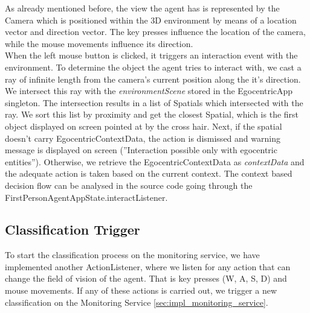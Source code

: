 As already mentioned before, the view the agent has is represented by the Camera which is positioned within the 3D environment by means of a location vector and direction vector. The key presses influence the location of the camera, while the mouse movements influence its direction.\\

When the left mouse button is clicked, it triggers an interaction event with the environment. To determine the object the agent tries to interact with, we cast a ray of infinite length from the camera's current position along the it's direction. We intersect this ray with the \emph{environmentScene} stored in the EgocentricApp singleton. The intersection results in a list of Spatials which intersected with the ray. We sort this list by proximity and get the closest Spatial, which is the first object displayed on screen pointed at by the cross hair. Next, if the spatial doesn't carry EgocentricContextData, the action is dismissed and warning message is displayed on screen (''Interaction possible only with egocentric entities''). Otherwise, we retrieve the EgocentricContextData as \emph{contextData} and the adequate action is taken based on the current context. The context based decision flow can be analysed in the source code going through the FirstPersonAgentAppState.interactListener.\\

\subsection{Classification Trigger} %
\label{subsec:impl_classification_trigger}
To start the classification process on the monitoring service, we have implemented another ActionListener, where we listen for any action that can change the field of vision of the agent. That is key presses (W, A, S, D) and mouse movements. If any of these actions is carried out, we trigger a new classification on the Monitoring Service \ref{sec:impl_monitoring_service}.

